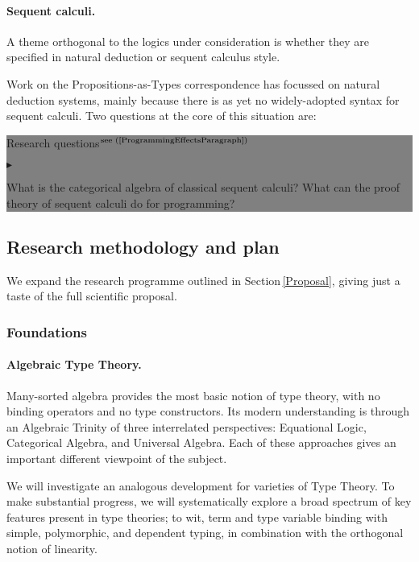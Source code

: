 \documentclass[11pt,twocolumn]{article}
\newenvironment{btritemize}
  {\begin{list}{\btr}
  {\setlength{\topsep}{2pt}
   \setlength{\partopsep}{2pt}
   \setlength{\itemsep}{2.5pt}
   \setlength{\parsep}{2.5pt}
   \setlength{\leftmargin}{1em}
   \setlength{\labelwidth}{.5em}}}
  {\end{list}}
\newcommand{\mytextsf}[1]{\textsf{\small #1}}
\newcommand{\hl}[1]{#1}%
\newcommand{\btr}{$\blacktriangleright$}
\newcommand{\reqpsize}{8.113395cm}%
\newcommand{\req}[2]{\begin{center}\colorbox{grey}{\begin{minipage}{\reqpsize} 
  \mytextsf{Research question}\hfill$^{\mbox{\scriptsize see (#1) }}$\\[-5.5mm]
  \begin{btritemize}
  \item #2
  \end{btritemize}
\end{minipage}}\end{center}}
\newcommand{\reqs}[2]{\begin{center}\colorbox{grey}{\begin{minipage}{\reqpsize}
  \mytextsf{Research questions}\hfill$^{\mbox{\scriptsize see (#1) }}$\\[-5.5mm]
  \begin{btritemize}
  \item #2
  \end{btritemize}
\end{minipage}}\end{center}}
\begin{document}
\paragraph*{Sequent calculi.}

A theme orthogonal to the logics under consideration is whether they are
specified in natural deduction or sequent calculus style. 
\pagebreak%

Work on the Propositions-as-Types correspondence has focussed on natural
deduction systems, mainly because there is as yet no 
widely-adopted %
syntax for sequent calculi.  Two questions at the core of this situation
are:
%
\reqs{\ref{ProgrammingEffectsParagraph}}
  {What is the categorical algebra of classical sequent calculi? %
%
  What can the proof theory of sequent calculi do for programming?}

\subsection{Research methodology and plan}

We expand the research programme outlined in Section\,\ref{Proposal}, giving
just a taste of the full scientific proposal.

\subsubsection{Foundations}
\label{Foundations}

\paragraph{Algebraic Type Theory.}
\label{AlgebraicTypeTheoryParagraph}

Many-sorted algebra provides the most basic notion of type theory, with no
binding operators and no type constructors.  Its modern understanding is
through an Algebraic Trinity of three interrelated perspectives: Equational
Logic, Categorical Algebra, and Universal Algebra.
Each of these approaches gives an important different viewpoint of the
subject.

We will \hl{investigate} an analogous development for varieties of Type
Theory.  To make substantial prog\-ress, we will systematically explore a broad
spectrum of key features present in type theories; to wit, term and type
variable binding with simple, polymorphic, and dependent typing, in
combination with the orthogonal notion of linearity.  
\end{document}
